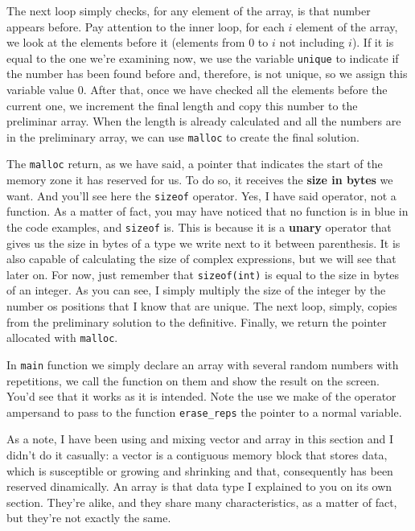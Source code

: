 \documentclass[a4paper]{article}
\begin{document}
The next loop simply checks, for any element of the array, is that number
appears before. Pay attention to the inner loop, for each $i$ element of the
array, we look at the elements before it (elements from 0 to $i$ not including
$i$). If it is equal to the one we're examining now,
we use the variable \verb!unique! to indicate if the number has
been found before and, therefore, is not unique, so we assign this variable
value 0. After that, once we have checked all the elements before the current
one, we increment the final length and copy this number to the preliminar array.
When the length is already calculated and all the numbers are in the preliminary
array, we can use \verb!malloc! to create the final solution.

The \verb!malloc! return, as we have said, a pointer that indicates the start of
the memory zone it has reserved for us. To do so, it receives the \textbf{size in
bytes} we want. And you'll see here the \lstinline[style=C]{sizeof} operator.
Yes, I have said operator, not a function. As a matter of fact, you may have
noticed that no function is in blue in the code examples, and \verb!sizeof!
is. This is because it is a \textbf{unary} operator that gives us the size in
bytes of a type we write next to it between parenthesis. It is also capable of
calculating the size of complex expressions, but we will see that later on.
For now, just remember that \verb!sizeof(int)! is equal to the size in bytes of
an integer. As you can see, I simply multiply the size of the integer by the
number os positions that I know that are unique. The next loop, simply, copies
from the preliminary solution to the definitive. Finally, we return the pointer
allocated with \verb!malloc!.

In \verb!main! function we simply declare an array with several random numbers
with repetitions, we call the function on them and show the result on the
screen. You'd see that it works as it is intended. Note the use we make of the
operator ampersand to pass to the function \verb!erase_reps! the pointer to
a normal variable.

As a note, I have been using and mixing vector and array in this section and
I didn't do it casually: a vector is a contiguous memory block that stores data,
which is susceptible or growing and shrinking and that, consequently has been
reserved dinamically. An array is that data type I explained to you on its own
section. They're alike, and they share many characteristics, as a matter of
fact, but they're not exactly the same.
\end{document}

